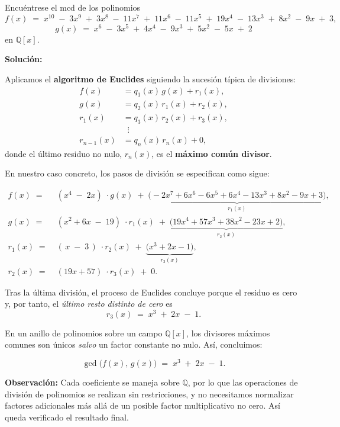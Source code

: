 Encuéntrese el mcd de los polinomios
\[
f(x) \;=\; x^{10} \;-\; 3x^9 \;+\; 3x^8 \;-\; 11x^7 \;+\; 11x^6 \;-\; 11x^5 
        \;+\; 19x^4 \;-\; 13x^3 \;+\; 8x^2 \;-\; 9x \;+\; 3,
\]
\[
g(x) \;=\; x^6 \;-\; 3x^5 \;+\; 4x^4 \;-\; 9x^3 \;+\; 5x^2 \;-\; 5x \;+\; 2
\]
en $\mathbb{Q}[x]$.

\textbf{Solución:} 

Aplicamos el \textbf{algoritmo de Euclides} siguiendo la sucesión típica de divisiones:
\[
\begin{aligned}
    f(x) &= q_1(x)\,g(x) + r_1(x), \\
    g(x) &= q_2(x)\,r_1(x) + r_2(x), \\
    r_1(x) &= q_3(x)\,r_2(x) + r_3(x), \\
          &\;\;\vdots \\
    r_{n-1}(x) &= q_n(x)\,r_n(x) + 0,
\end{aligned}
\]
donde el último residuo no nulo, \(r_n(x)\), es el \textbf{máximo común divisor}.

\medskip

En nuestro caso concreto, los pasos de división se especifican como sigue:

\[
\begin{aligned}
f(x) \;=\;& 
  (x^4 \;-\; 2x)\;\cdot g(x) 
  \;+\; \underbrace{\bigl(-2x^7 + 6x^6 - 6x^5 + 6x^4 - 13x^3 + 8x^2 - 9x + 3\bigr)}_{r_1(x)},
\\[4pt]
g(x) \;=\;& 
  (x^2 + 6x \;-\; 19)\;\cdot r_1(x) 
  \;+\; \underbrace{\bigl(19x^4 + 57x^3 + 38x^2 - 23x + 2\bigr)}_{r_2(x)},
\\[4pt]
r_1(x) \;=\;& 
  (\,x \;-\; 3\,)\;\cdot r_2(x) 
  \;+\; \underbrace{\bigl(x^3 + 2x - 1\bigr)}_{r_3(x)},
\\[4pt]
r_2(x) \;=\;& (19x+57 )\;\cdot r_3(x) \;+\; 0.
\end{aligned}
\]

Tras la última división, el proceso de Euclides concluye porque el residuo es cero y, por tanto, 
el \textit{último resto distinto de cero} es
\[
r_3(x) \;=\; x^3 \;+\; 2x \;-\; 1.
\]

En un anillo de polinomios sobre un campo $\mathbb{Q}[x]$, los divisores máximos comunes son únicos \emph{salvo} un factor constante no nulo. Así, concluimos:

\[
\boxed{\gcd\!\bigl(f(x),\,g(x)\bigr) \;=\; x^3 \;+\; 2x \;-\; 1.}
\]

\noindent
\textbf{Observación:} Cada coeficiente se maneja sobre \(\mathbb{Q}\), por lo que las operaciones de división de polinomios se realizan sin restricciones, y no necesitamos normalizar factores adicionales más allá de un posible factor multiplicativo no cero. Así queda verificado el resultado final. 
